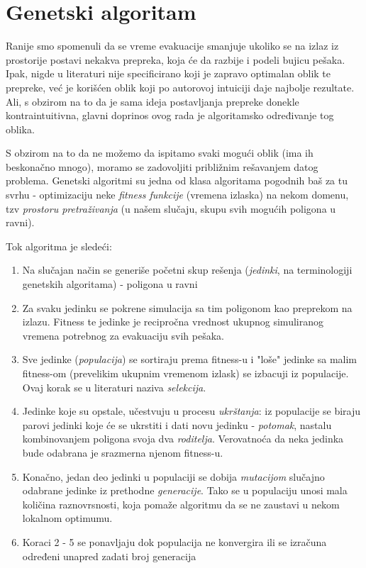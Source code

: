 \documentclass[12pt]{article}
\begin{document}
    \label{fenomeni}

\section{Genetski algoritam}\label{GA}

Ranije smo spomenuli da se vreme evakuacije smanjuje ukoliko se na izlaz iz prostorije postavi nekakva prepreka, koja će da razbije i podeli bujicu pešaka. Ipak, nigde u literaturi nije specificirano koji je zapravo optimalan oblik te prepreke, već je korišćen oblik koji po autorovoj intuiciji daje najbolje rezultate. Ali, s obzirom na to da je sama ideja postavljanja prepreke donekle kontraintuitivna, glavni doprinos ovog rada je algoritamsko određivanje tog oblika.

S obzirom na to da ne možemo da ispitamo svaki mogući oblik (ima ih beskonačno mnogo), moramo se zadovoljiti približnim rešavanjem datog problema. Genetski algoritmi su jedna od klasa algoritama pogodnih baš za tu svrhu - optimizaciju neke \emph{fitness funkcije} (vremena izlaska) na nekom domenu, tzv \emph{prostoru pretraživanja} (u našem slučaju, skupu svih mogućih poligona u ravni).

Tok algoritma je sledeći:
\begin{enumerate}
\item Na slučajan način se generiše početni skup rešenja (\emph{jedinki}, na terminologiji genetskih algoritama) - poligona u ravni
\item Za svaku jedinku se pokrene simulacija sa tim poligonom kao preprekom na izlazu. Fitness te jedinke je recipročna vrednost ukupnog simuliranog vremena potrebnog za evakuaciju svih pešaka.
\item Sve jedinke (\emph{populacija}) se sortiraju prema fitness-u i "loše" jedinke sa malim fitness-om (prevelikim ukupnim vremenom izlask) se izbacuji iz populacije. Ovaj korak se u literaturi naziva \emph{selekcija}.
\item Jedinke koje su opstale, učestvuju u procesu \emph{ukrštanja}: iz populacije se biraju parovi jedinki koje će se ukrstiti i dati novu jedinku - \emph{potomak}, nastalu kombinovanjem poligona svoja dva \emph{roditelja}. Verovatnoća da neka jedinka bude odabrana je srazmerna njenom fitness-u.
\item Konačno, jedan deo jedinki u populaciji se dobija \emph{mutacijom} slučajno odabrane jedinke iz prethodne \emph{generacije}. Tako se u populaciju unosi mala količina raznovrsnosti, koja pomaže algoritmu da se ne zaustavi u nekom lokalnom optimumu.
\item Koraci 2 - 5 se ponavljaju dok populacija ne konvergira ili se izračuna određeni unapred zadati broj generacija
\end{enumerate}
\end{document}
